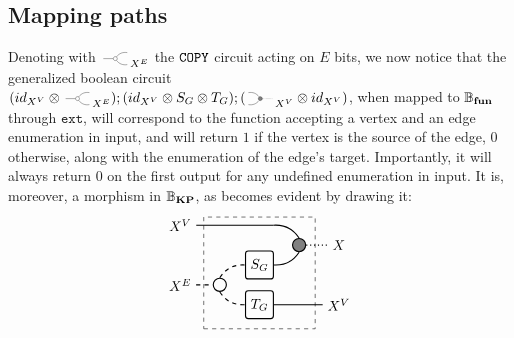 \documentclass[submission,copyright,creativecommons,sharealike,noncommercial]{eptcs}
\begin{document}
\subsection{Mapping paths}
%
%
Denoting with $\COPYSym_{X^E}$ the $\texttt{COPY}$ circuit acting 
on $E$ bits, we now notice that the generalized boolean circuit 
$(\Id{X^V} \Tensor \COPYSym_{X^E});(\Id{X^V} 
  \Tensor S_G \Tensor T_G);(\MATCHSym_{X^V} \Tensor \Id{X^V})$,
when mapped to $\mathbb{B}_\textbf{fun}$ through $\texttt{ext}$, will correspond to the 
function accepting a vertex and an edge enumeration in input, and 
will return $1$ if the vertex is the source of the edge, $0$ otherwise,
along with the enumeration of the edge's target.
Importantly, it will always return $0$ on the first output for 
any undefined enumeration in input. It is, moreover, a morphism 
in $\mathbb{B}_\textbf{KP}$, as becomes evident by drawing it:
%
%
\begin{equation*}
  \begin{tikzpicture}
    \node[draw, circle, radius=5pt, thick] (copy) at (-1,0.5) {};
    \node[draw, minimum height=20, minimum width=20, rounded corners=2, thick] (S) at (0,1) {$S_G$};
    \node[draw, minimum height=20, minimum width=20, rounded corners=2, thick] (T) at (0,0) {$T_G$};
    \node[draw, fill=gray, circle, radius=5pt, thick] (mat) at (1,1.5) {};

    \node[draw, dashed, minimum height=80, minimum width=80] (contour) at (0,0.8) {};

    \node (Xv) at (-2,2) {$X^V$};
    \node (Xe) at (-2,0.5) {$X^E$};
    \node (X) at (2,1.5) {$X$};
    \node (Xv2) at (2,0) {$X^V$};

    \draw[-, thick] (Xv) to (10pt,2);
    \draw[bend left, thick] (10pt,2) to (mat.north);
    \draw[bend right, thick] (S.east) to (mat.south);

    \draw[dashed, -, thick] (Xe) to (copy.west);

    \draw[dashed, bend left, thick] (copy.north) to (S.west);
    \draw[dashed, bend right, thick] (copy.south) to (T.west);

    \draw[-, dotted, thick] (mat.east) -- (X);
    \draw[-, thick] (T.east) -- (Xv2.west);
  \end{tikzpicture}
\end{equation*}
%
%
\end{document}

